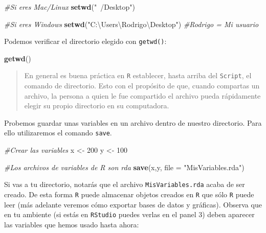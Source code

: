 \documentclass[
]{book}
\newenvironment{Shaded}{\begin{snugshade}}{\end{snugshade}}
\newcommand{\CommentTok}[1]{\textcolor[rgb]{0.56,0.35,0.01}{\textit{#1}}}
\newcommand{\DataTypeTok}[1]{\textcolor[rgb]{0.13,0.29,0.53}{#1}}
\newcommand{\DecValTok}[1]{\textcolor[rgb]{0.00,0.00,0.81}{#1}}
\newcommand{\KeywordTok}[1]{\textcolor[rgb]{0.13,0.29,0.53}{\textbf{#1}}}
\newcommand{\NormalTok}[1]{#1}
\newcommand{\StringTok}[1]{\textcolor[rgb]{0.31,0.60,0.02}{#1}}
\begin{document}
\begin{Shaded}
\begin{Highlighting}[]
\CommentTok{#Si eres Mac/Linux}
\KeywordTok{setwd}\NormalTok{(}\StringTok{"~/Desktop"}\NormalTok{) }

\CommentTok{#Si eres Windows}
\KeywordTok{setwd}\NormalTok{(}\StringTok{"C:\textbackslash{}Users\textbackslash{}Rodrigo\textbackslash{}Desktop"}\NormalTok{) }\CommentTok{#Rodrigo = Mi usuario}
\end{Highlighting}
\end{Shaded}

Podemos verificar el directorio elegido con \texttt{getwd()}:

\begin{Shaded}
\begin{Highlighting}[]
\KeywordTok{getwd}\NormalTok{()}
\end{Highlighting}
\end{Shaded}

\begin{quote}
En general es buena práctica en \texttt{R} establecer, hasta arriba del \texttt{Script}, el comando de directorio. Esto con el propósito de que, cuando compartas un archivo, la persona a quien le fue compartido el archivo pueda rápidamente elegir su propio directorio en su computadora.
\end{quote}

Probemos guardar unas variables en un archivo dentro de nuestro directorio. Para ello utilizaremos el comando \texttt{save}.

\begin{Shaded}
\begin{Highlighting}[]
\CommentTok{#Crear las variables}
\NormalTok{x <-}\StringTok{ }\DecValTok{200}
\NormalTok{y <-}\StringTok{ }\DecValTok{100}

\CommentTok{#Los archivos de variables de R son rda}
\KeywordTok{save}\NormalTok{(x,y, }\DataTypeTok{file =} \StringTok{"MisVariables.rda"}\NormalTok{)}
\end{Highlighting}
\end{Shaded}

Si vas a tu directorio, notarás que el archivo \texttt{MisVariables.rda} acaba de ser creado. De esta forma \texttt{R} puede almacenar objetos creados en \texttt{R} que sólo \texttt{R} puede leer (más adelante veremos cómo exportar bases de datos y gráficas). Observa que en tu ambiente (si estás en \texttt{RStudio} puedes verlas en el panel 3) deben aparecer las variables que hemos usado hasta ahora:
\end{document}
